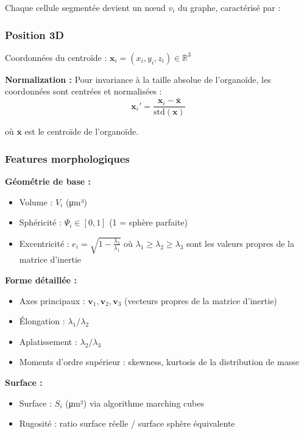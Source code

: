 Chaque cellule segmentée devient un nœud $v_i$ du graphe, caractérisé par :

\subsubsection{Position 3D}

Coordonnées du centroïde : $\mathbf{x}_i = (x_i, y_i, z_i) \in \mathbb{R}^3$

\textbf{Normalization :}
Pour invariance à la taille absolue de l'organoïde, les coordonnées sont centrées et normalisées :
\[
\mathbf{x}_i' = \frac{\mathbf{x}_i - \bar{\mathbf{x}}}{\text{std}(\mathbf{x})}
\]

où $\bar{\mathbf{x}}$ est le centroïde de l'organoïde.

\subsubsection{Features morphologiques}

\textbf{Géométrie de base :}
\begin{itemize}
    \item Volume : $V_i$ (μm³)
    \item Sphéricité : $\Psi_i \in [0,1]$ (1 = sphère parfaite)
    \item Excentricité : $e_i = \sqrt{1 - \frac{\lambda_3}{\lambda_1}}$ où $\lambda_1 \geq \lambda_2 \geq \lambda_3$ sont les valeurs propres de la matrice d'inertie
\end{itemize}

\textbf{Forme détaillée :}
\begin{itemize}
    \item Axes principaux : $\mathbf{v}_1, \mathbf{v}_2, \mathbf{v}_3$ (vecteurs propres de la matrice d'inertie)
    \item Élongation : $\lambda_1 / \lambda_2$
    \item Aplatissement : $\lambda_2 / \lambda_3$
    \item Moments d'ordre supérieur : skewness, kurtosis de la distribution de masse
\end{itemize}

\textbf{Surface :}
\begin{itemize}
    \item Surface : $S_i$ (μm²) via algorithme marching cubes
    \item Rugosité : ratio surface réelle / surface sphère équivalente
\end{itemize}


